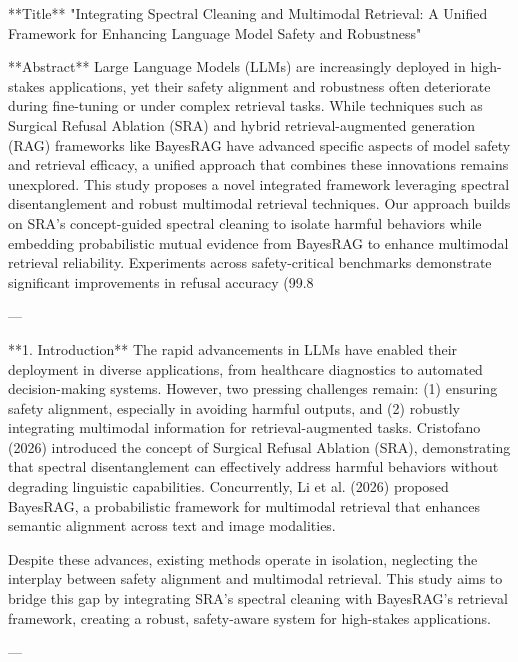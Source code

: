 **Title**  
"Integrating Spectral Cleaning and Multimodal Retrieval: A Unified Framework for Enhancing Language Model Safety and Robustness"

**Abstract**  
Large Language Models (LLMs) are increasingly deployed in high-stakes applications, yet their safety alignment and robustness often deteriorate during fine-tuning or under complex retrieval tasks. While techniques such as Surgical Refusal Ablation (SRA) and hybrid retrieval-augmented generation (RAG) frameworks like BayesRAG have advanced specific aspects of model safety and retrieval efficacy, a unified approach that combines these innovations remains unexplored. This study proposes a novel integrated framework leveraging spectral disentanglement and robust multimodal retrieval techniques. Our approach builds on SRA's concept-guided spectral cleaning to isolate harmful behaviors while embedding probabilistic mutual evidence from BayesRAG to enhance multimodal retrieval reliability. Experiments across safety-critical benchmarks demonstrate significant improvements in refusal accuracy (99.8%

---

**1. Introduction**  
The rapid advancements in LLMs have enabled their deployment in diverse applications, from healthcare diagnostics to automated decision-making systems. However, two pressing challenges remain: (1) ensuring safety alignment, especially in avoiding harmful outputs, and (2) robustly integrating multimodal information for retrieval-augmented tasks. Cristofano (2026) introduced the concept of Surgical Refusal Ablation (SRA), demonstrating that spectral disentanglement can effectively address harmful behaviors without degrading linguistic capabilities. Concurrently, Li et al. (2026) proposed BayesRAG, a probabilistic framework for multimodal retrieval that enhances semantic alignment across text and image modalities.

Despite these advances, existing methods operate in isolation, neglecting the interplay between safety alignment and multimodal retrieval. This study aims to bridge this gap by integrating SRA's spectral cleaning with BayesRAG's retrieval framework, creating a robust, safety-aware system for high-stakes applications.

---

